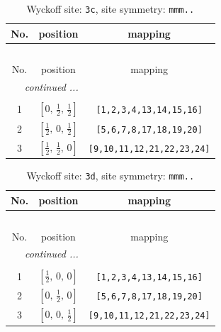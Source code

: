 \documentclass[fleqn,8pt]{jsarticle}
\begin{document}
\begin{longtable}{ccc}
\caption{Wyckoff site: {\tt 3c}, site symmetry: {\tt mmm..}}
 \\
 \hline \hline
No. & position & mapping \\ \hline \endfirsthead

\multicolumn{2}{l}{\tablename\ \thetable{}} \\
 \hline \hline
No. & position & mapping \\ \hline \endhead

 \hline \hline
\multicolumn{2}{r}{\footnotesize\it continued ...} \\ \endfoot

 \hline \hline
\multicolumn{2}{r}{} \\ \endlastfoot

1 & $\left[ 0,\, \frac{1}{2},\, \frac{1}{2} \right]$ & {\tt [1,2,3,4,13,14,15,16]} \\ \hline
2 & $\left[ \frac{1}{2},\, 0,\, \frac{1}{2} \right]$ & {\tt [5,6,7,8,17,18,19,20]} \\ \hline
3 & $\left[ \frac{1}{2},\, \frac{1}{2},\, 0 \right]$ & {\tt [9,10,11,12,21,22,23,24]} \\
\end{longtable}
\renewcommand{\arraystretch}{1.2}
\begin{longtable}{ccc}
\caption{Wyckoff site: {\tt 3d}, site symmetry: {\tt mmm..}}
 \\
 \hline \hline
No. & position & mapping \\ \hline \endfirsthead

\multicolumn{2}{l}{\tablename\ \thetable{}} \\
 \hline \hline
No. & position & mapping \\ \hline \endhead

 \hline \hline
\multicolumn{2}{r}{\footnotesize\it continued ...} \\ \endfoot

 \hline \hline
\multicolumn{2}{r}{} \\ \endlastfoot

1 & $\left[ \frac{1}{2},\, 0,\, 0 \right]$ & {\tt [1,2,3,4,13,14,15,16]} \\ \hline
2 & $\left[ 0,\, \frac{1}{2},\, 0 \right]$ & {\tt [5,6,7,8,17,18,19,20]} \\ \hline
3 & $\left[ 0,\, 0,\, \frac{1}{2} \right]$ & {\tt [9,10,11,12,21,22,23,24]} \\
\end{longtable}
\renewcommand{\arraystretch}{1.2}
\end{document}
